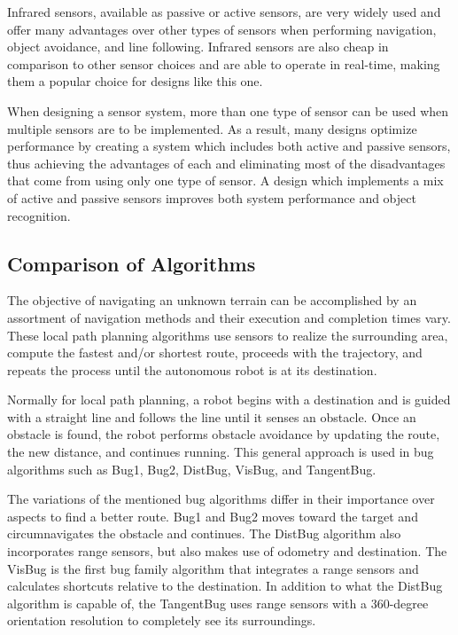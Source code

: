 Infrared sensors, available as passive or active sensors, are very widely used and offer many advantages over other types of sensors when performing navigation, object avoidance, and line following.  Infrared sensors are also cheap in comparison to other sensor choices and are able to operate in real-time, making them a popular choice for designs like this one. \cite{Calin}

When designing a sensor system, more than one type of sensor can be used when multiple sensors are to be implemented.  As a result, many designs optimize performance by creating a system which includes both active and passive sensors, thus achieving the advantages of each and eliminating most of the disadvantages that come from using only one type of sensor.  A design which implements a mix of active and passive sensors improves both system performance and object recognition. \cite{Discant}  

\subsection*{Comparison of Algorithms}
The objective of navigating an unknown terrain can be accomplished by an assortment of navigation methods and their execution and completion times vary. These local path planning algorithms use sensors to realize the surrounding area, compute the fastest and/or shortest route, proceeds with the trajectory, and repeats the process until the autonomous robot is at its destination.

Normally for local path planning, a robot begins with a destination and is guided with a straight line and follows the line until it senses an obstacle. Once an obstacle is found, the robot performs obstacle avoidance by updating the route, the new distance, and continues running. This general approach is used in bug algorithms such as Bug1, Bug2, DistBug, VisBug, and TangentBug.

The variations of the mentioned bug algorithms differ in their importance over aspects to find a better route. Bug1 and Bug2 moves toward the target and circumnavigates the obstacle and continues. The DistBug algorithm also incorporates range sensors, but also makes use of odometry and destination. The VisBug is the first bug family algorithm that integrates a range sensors and calculates shortcuts relative to the destination. In addition to what the DistBug algorithm is capable of, the TangentBug uses range sensors with a 360-degree orientation resolution to completely see its surroundings.

